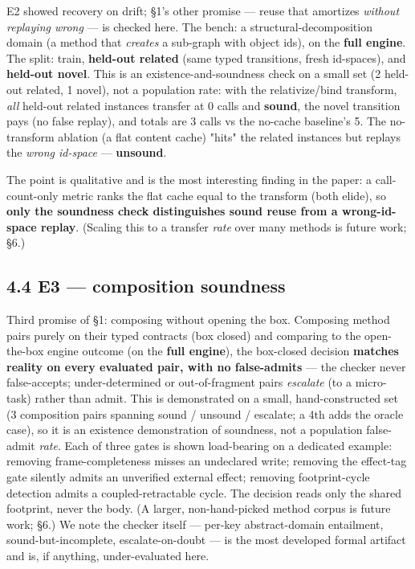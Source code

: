 \documentclass[11pt]{article}
\begin{document}
E2 showed recovery on drift; §1's other promise — reuse that amortizes \emph{without replaying wrong} — is checked here. The bench: a structural-decomposition domain (a method that \emph{creates} a sub-graph with object ids), on the \textbf{full engine}. The split: train, \textbf{held-out related} (same typed transitions, fresh id-spaces), and \textbf{held-out novel}. This is an existence-and-soundness check on a small set (2 held-out related, 1 novel), not a population rate: with the relativize/bind transform, \emph{all} held-out related instances transfer at 0 calls and \textbf{sound}, the novel transition pays (no false replay), and totals are 3 calls vs the no-cache baseline's 5. The no-transform ablation (a flat content cache) "hits" the related instances but replays the \emph{wrong id-space} — \textbf{unsound}.

The point is qualitative and is the most interesting finding in the paper: a call-count-only metric ranks the flat cache equal to the transform (both elide), so \textbf{only the soundness check distinguishes sound reuse from a wrong-id-space replay}. (Scaling this to a transfer \emph{rate} over many methods is future work; §6.)

\subsection*{4.4 E3 — composition soundness}

Third promise of §1: composing without opening the box. Composing method pairs purely on their typed contracts (box closed) and comparing to the open-the-box engine outcome (on the \textbf{full engine}), the box-closed decision \textbf{matches reality on every evaluated pair, with no false-admits} — the checker never false-accepts; under-determined or out-of-fragment pairs \emph{escalate} (to a micro-task) rather than admit. This is demonstrated on a small, hand-constructed set (3 composition pairs spanning sound / unsound / escalate; a 4th adds the oracle case), so it is an existence demonstration of soundness, not a population false-admit \emph{rate}. Each of three gates is shown load-bearing on a dedicated example: removing frame-completeness misses an undeclared write; removing the effect-tag gate silently admits an unverified external effect; removing footprint-cycle detection admits a coupled-retractable cycle. The decision reads only the shared footprint, never the body. (A larger, non-hand-picked method corpus is future work; §6.) We note the checker itself — per-key abstract-domain entailment, sound-but-incomplete, escalate-on-doubt — is the most developed formal artifact and is, if anything, under-evaluated here.
\end{document}

